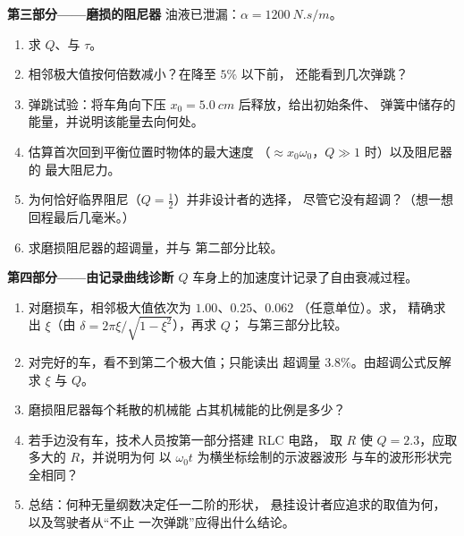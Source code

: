 \begin{problem}
\medskip
\noindent\textbf{第三部分——磨损的阻尼器}
油液已泄漏：$\alpha = \qty{1200}{N.s/m}$。
\begin{enumerate}[resume]
  \item 求 $Q$、与 $\tau$。
  \item 相邻极大值按何倍数减小？在降至 $5\%$ 以下前，
        还能看到几次弹跳？
  \item 弹跳试验：将车角向下压 $x_0 =
        \qty{5.0}{cm}$ 后释放，给出初始条件、
        弹簧中储存的能量，并说明该能量去向何处。
  \item 估算首次回到平衡位置时物体的最大速度
        （$\approx x_0\omega_0$，$Q \gg 1$ 时）以及阻尼器的
        最大阻尼力。
  \item 为何恰好临界阻尼（$Q = \tfrac12$）并非设计者的选择，
        尽管它没有超调？（想一想
        回程最后几毫米。）
  \item 求磨损阻尼器的超调量，并与
        第二部分比较。
\end{enumerate}

\medskip
\noindent\textbf{第四部分——由记录曲线诊断 $Q$}
车身上的加速度计记录了自由衰减过程。
\begin{enumerate}[resume]
  \item 对磨损车，相邻极大值依次为 $1.00$、$0.25$、$0.062$
        （任意单位）。求，
        精确求出 $\xi$（由 $\delta = 2\pi\xi/\sqrt{1 - \xi^2}$），再求 $Q$；
        与第三部分比较。
  \item 对完好的车，看不到第二个极大值；只能读出
        超调量 $3.8\%$。由超调公式反解
        求 $\xi$ 与 $Q$。
  \item 磨损阻尼器每个耗散的机械能
        占其机械能的比例是多少？
  \item 若手边没有车，技术人员按第一部分搭建 RLC 电路，
        取 $R$ 使 $Q = 2.3$，应取多大的 $R$，并说明为何
        以 $\omega_0 t$ 为横坐标绘制的示波器波形
        与车的波形形状完全相同？
  \item 总结：何种无量纲数决定任一二阶的形状，
        悬挂设计者应追求的取值为何，
        以及驾驶者从“不止
        一次弹跳”应得出什么结论。
\end{enumerate}
\end{problem}
